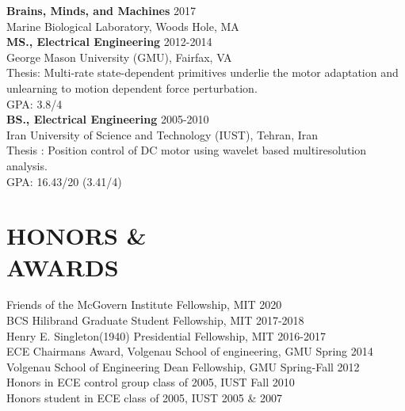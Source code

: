 \documentclass[margin, 10pt]{res}
\begin{document}
\begin{resume}
\textbf{Brains, Minds, and Machines} \hfill 2017\\
Marine Biological Laboratory, Woods Hole, MA   \
\vspace{2.5mm} \\
\textbf{ MS., Electrical Engineering}  \hfill 2012-2014 \\
George Mason University (GMU), Fairfax, VA \
\vspace{1mm} \\
Thesis: Multi-rate state-dependent primitives underlie the motor adaptation and unlearning to motion dependent force perturbation. \\
GPA: 3.8/4 
\vspace{2.5mm} \\
\textbf{ BS.,  Electrical Engineering}  \hfill 2005-2010 \\
Iran University of Science and Technology (IUST), Tehran, Iran \
\vspace{1mm} \\
Thesis : Position control of DC motor using wavelet based multiresolution analysis. \\
GPA: 16.43/20 (3.41/4)
\section{HONORS \& \\  AWARDS} 
Friends of the McGovern Institute Fellowship, MIT \hfill  2020 \\
BCS Hilibrand Graduate Student Fellowship, MIT \hfill 2017-2018 \\
Henry E. Singleton(1940) Presidential Fellowship, MIT \hfill 2016-2017 \\
ECE Chairmans Award, Volgenau School of engineering, GMU  \hfill Spring 2014 \\
Volgenau School of Engineering Dean Fellowship, GMU  \hfill Spring-Fall 2012 \\
Honors in ECE control group class of 2005, IUST  \hfill Fall 2010 \\
Honors student in ECE class of 2005, IUST  \hfill 2005 \& 2007 

\end{resume}
\end{document}

